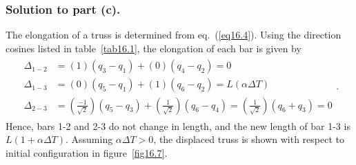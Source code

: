 \documentclass{AeroStructure-ERJohnson}
\begin{document}
\begin{example}
\subsubsection{Solution to part (c).} The elongation of a truss is determined from eq.~(\ref{eq16.4}). Using the direction cosines listed in table~\ref{tab16.1}, the elongation of each bar is given by
\begin{align}\label{eq16.3i}\tag{i}
\begin{split}
\Delta_{1-2}&=(1)\left(q_{3}-q_{1}\right)+(0)\left(q_{4}-q_{2}\right)=0 \\
\Delta_{1-3}&=(0)\left(q_{5}-q_{1}\right)+(1)\left(q_{6}-q_{2}\right)=L(\alpha \Delta T) \\
\Delta_{2-3}&=\left(\frac{-1}{\sqrt{2}}\right)\left(q_{5}-q_{3}\right)+\left(\frac{1}{\sqrt{2}}\right)\left(q_{6}-q_{4}\right)=\left(\frac{1}{\sqrt{2}}\right)\left(q_{6}+q_{3}\right)=0
\end{split}.
\end{align}
Hence, bars 1-2 and 2-3 do not change in length, and the new length of bar 1-3 is $L(1+\alpha \Delta T)$. Assuming $\alpha \Delta T>0$, the displaced truss is shown with respect to initial configuration in figure~\ref{fig16.7}.
\end{example}

\end{document}
